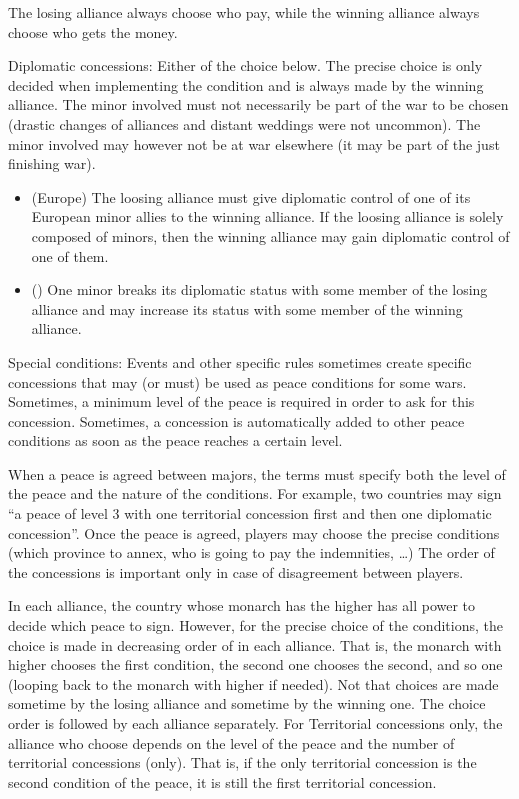 \begin{modlist}
  The losing alliance always choose who pay, while the winning alliance always
  choose who gets the money.
\item[Diplomatic concessions:] Either of the choice below. The precise choice
  is only decided when implementing the condition and is always made by the
  winning alliance. The minor involved must not necessarily be part of the war
  to be chosen (drastic changes of alliances and distant weddings were not
  uncommon). The minor involved may however not be at war elsewhere (it may be
  part of the just finishing war).
  \begin{itemize}
  \item (Europe) The loosing alliance must give diplomatic control of one of
    its European minor allies to the winning alliance. If the loosing alliance
    is solely composed of minors, then the winning alliance may gain
    diplomatic control of one of them.
  \item (\ROTW) One \ROTW minor breaks its diplomatic status with some member
    of the losing alliance and may increase its status with some member of the
    winning alliance.
  \end{itemize}
\item[Special conditions:] Events and other specific rules sometimes create
  specific concessions that may (or must) be used as peace conditions for some
  wars. Sometimes, a minimum level of the peace is required in order to ask
  for this concession. Sometimes, a concession is automatically added to other
  peace conditions as soon as the peace reaches a certain level.
\end{modlist}

When a peace is agreed between majors, the terms must specify both the level
of the peace and the nature of the conditions. For example, two countries may
sign ``a peace of level 3 with one territorial concession first and then one
diplomatic concession''.
\bparag Once the peace is agreed, players may choose the precise conditions
(which province to annex, who is going to pay the indemnities, \ldots)
\bparag The order of the concessions is important only in case of disagreement
between players.

\label{chPeace:Implementing conditions}
In each alliance, the country whose monarch has the higher \DIP has all power
to decide which peace to sign.
\bparag However, for the precise choice of the conditions, the choice is made
in decreasing order of \DIP in each alliance. That is, the monarch with higher
\DIP chooses the first condition, the second one chooses the second, and so
one (looping back to the monarch with higher \DIP if needed).
\bparag Not that choices are made sometime by the losing alliance and sometime
by the winning one. The choice order is followed by each alliance separately.
\bparag For Territorial concessions only, the alliance who choose depends on
the level of the peace and the number of territorial concessions (only). That
is, if the only territorial concession is the second condition of the peace,
it is still the first territorial concession.

